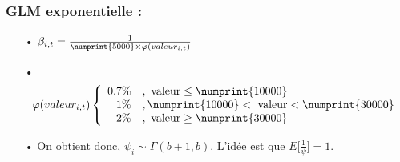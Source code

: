 \subsubsection*{GLM exponentielle :}
\begin{itemize}
\item[•] $\beta _{i,t} = \frac{1}{\numprint{5000} \times \varphi(valeur_{i,t})}$
\item[•] \begin{align*}
\varphi(valeur_{i,t}) & \left\{
     \begin{array}{rl}
      0.7 \% &, \text{ valeur} \leq \numprint{10000} \\
      1 \% &, \numprint{10000}< \text{ valeur} < \numprint{30000}  \\
      2 \% &, \text{ valeur} \geq \numprint{30000} \\
     \end{array}
     \right. \\
\end{align*}
\item[•] On obtient donc, $\psi_i \sim \Gamma(b+1, b)$. L'idée est que $E\Bigg[\frac{1}{\psi} \Bigg] =1$.
\end{itemize}

